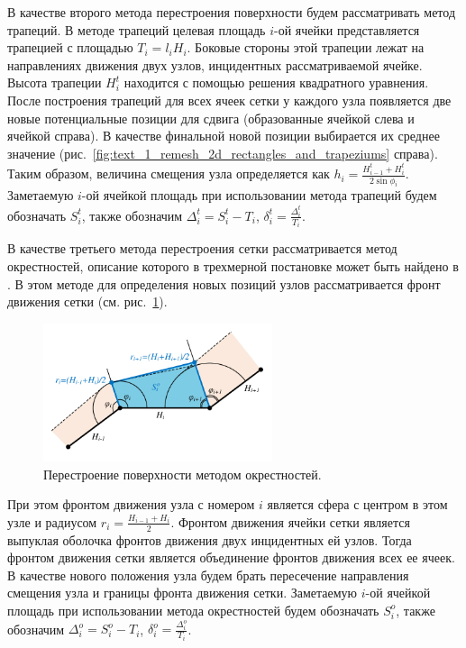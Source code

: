 \documentclass[
11pt,%
tightenlines,%
twoside,%
onecolumn,%
nofloats,%
nobibnotes,%
nofootinbib,%
superscriptaddress,%
noshowpacs,%
centertags]%
{revtex4}
\begin{document}
В качестве второго метода перестроения поверхности будем рассматривать метод трапеций.
В методе трапеций целевая площадь $i$-ой ячейки представляется трапецией с площадью $T_i = l_i H_i$.
Боковые стороны этой трапеции лежат на направлениях движения двух узлов, инцидентных рассматриваемой ячейке.
Высота трапеции $H_i^t$ находится с помощью решения квадратного уравнения.
После построения трапеций для всех ячеек сетки у каждого узла появляется две новые потенциальные позиции для сдвига (образованные ячейкой слева и ячейкой справа).
В качестве финальной новой позиции выбирается их среднее значение (рис.~\ref{fig:text_1_remesh_2d_rectangles_and_trapeziums} справа).
Таким образом, величина смещения узла определяется как $h_i = \frac{H_{i - 1}^t + H_i^t}{2 \sin \phi_i}$.
Заметаемую $i$-ой ячейкой площадь при использовании метода трапеций будем обозначать $S_i^t$, также обозначим $\Delta_i^t = S_i^t - T_i$, $\delta_i^t = \frac{\Delta_i^t}{T_i}$.

В качестве третьего метода перестроения сетки рассматривается метод окрестностей, описание которого в трехмерной постановке может быть найдено в \cite{Meshcheryakov}.
В этом методе для определения новых позиций узлов рассматривается фронт движения сетки (см. рис.~\ref{fig:text_1_remesh_2d_okrestnost}).

\begin{figure}[ht]
\setcaptionmargin{5mm}
\onelinecaptionstrue  %
\includegraphics[width=0.6\textwidth]{pics/remesh_okrestnost.pdf}
\caption{Перестроение поверхности методом окрестностей.}
\label{fig:text_1_remesh_2d_okrestnost}
\end{figure}

При этом фронтом движения узла с номером $i$ является сфера с центром в этом узле и радиусом $r_i = \frac{H_{i - 1} + H_i}{2}$.
Фронтом движения ячейки сетки является выпуклая оболочка фронтов движения двух инцидентных ей узлов.
Тогда фронтом движения сетки является объединение фронтов движения всех ее ячеек.
В качестве нового положения узла будем брать пересечение направления смещения узла и границы фронта движения сетки.
Заметаемую $i$-ой ячейкой площадь при использовании метода окрестностей будем обозначать $S_i^o$, также обозначим $\Delta_i^o = S_i^o - T_i$, $\delta_i^o = \frac{\Delta_i^o}{T_i}$.
\end{document}
